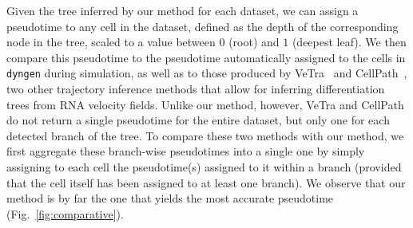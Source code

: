 \documentclass[pdflatex,sn-mathphys-num]{sn-jnl}%
\theoremstyle{thmstyleone}%
\theoremstyle{thmstyletwo}%
\theoremstyle{thmstylethree}%
\begin{document}
\medbreak
Given the tree inferred by our method for each dataset, we can assign a pseudotime to any cell in the dataset, defined as the depth of the corresponding node in the tree, scaled to a value between $0$ (root) and $1$ (deepest leaf). We then compare this pseudotime to the pseudotime automatically assigned to the cells in \texttt{dyngen} during simulation, as well as to those produced by VeTra~\cite{weng_vetra_2021} and CellPath~\cite{zhang_cellpath_2021}, two other trajectory inference methods that allow for inferring differentiation trees from RNA velocity fields. Unlike our method, however, VeTra and CellPath do not return a single pseudotime for the entire dataset, but only one for each detected branch of the tree. To compare these two methods with our method, we first aggregate these branch-wise pseudotimes into a single one by simply assigning to each cell the pseudotime(s) assigned to it within a branch (provided that the cell itself has been assigned to at least one branch). We observe that our method is by far the one that yields the most accurate pseudotime (Fig.~\ref{fig:comparative}). 
\end{document}
